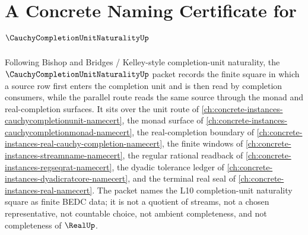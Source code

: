 \chapter{A Concrete Naming Certificate for $\CauchyCompletionUnitNaturalityUp$}
\label{ch:concrete-instances-cauchycompletionunitnaturality-namecert}

Following Bishop and Bridges / Kelley-style completion-unit naturality, the $\CauchyCompletionUnitNaturalityUp$ packet records the finite square in which a source row first enters the completion unit and is then read by completion consumers, while the parallel route reads the same source through the monad and real-completion surfaces. It sits over the unit route of \autoref{ch:concrete-instances-cauchycompletionunit-namecert}, the monad surface of \autoref{ch:concrete-instances-cauchycompletionmonad-namecert}, the real-completion boundary of \autoref{ch:concrete-instances-real-cauchy-completion-namecert}, the finite windows of \autoref{ch:concrete-instances-streamname-namecert}, the regular rational readback of \autoref{ch:concrete-instances-regseqrat-namecert}, the dyadic tolerance ledger of \autoref{ch:concrete-instances-dyadicratcore-namecert}, and the terminal real seal of \autoref{ch:concrete-instances-real-namecert}. The packet names the L10 completion-unit naturality square as finite BEDC data; it is not a quotient of streams, not a chosen representative, not countable choice, not ambient completeness, and not completeness of $\RealUp$.

